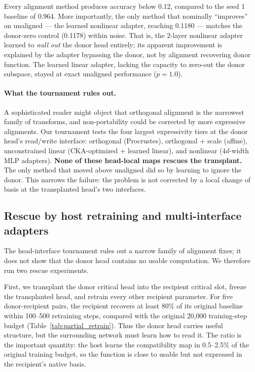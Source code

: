 \documentclass[final]{article}
\begin{document}
Every alignment method produces accuracy below 0.12, compared to the seed 1
baseline of 0.964. More importantly, the only method that nominally
``improves'' on unaligned --- the learned nonlinear adapter, reaching 0.1180
--- matches the donor-zero control (0.1178) within noise. That is, the
2-layer nonlinear adapter learned to \emph{null out} the donor head entirely;
its apparent improvement is explained by the adapter bypassing the donor, not
by alignment recovering donor function. The learned linear adapter, lacking
the capacity to zero-out the donor subspace, stayed at exact unaligned
performance ($p=1.0$).

\paragraph{What the tournament rules out.}
A sophisticated reader might object that orthogonal alignment is the narrowest
family of transforms, and non-portability could be corrected by more
expressive alignments. Our tournament tests the four largest expressivity
tiers at the donor head's read/write interface: orthogonal (Procrustes),
orthogonal + scale (affine), unconstrained linear (CKA-optimized + learned
linear), and nonlinear ($4d$-width MLP adapters). \textbf{None of these
head-local maps rescues the transplant.} The only method that moved above
unaligned did so by learning to ignore the donor. This narrows the failure:
the problem is not corrected by a local change of basis at the transplanted
head's two interfaces.

\subsection{Rescue by host retraining and multi-interface adapters}
\label{sec:rescue}

The head-interface tournament rules out a narrow family of alignment fixes; it
does not show that the donor head contains no usable computation. We therefore
run two rescue experiments.

First, we transplant the donor critical head into the recipient critical slot,
freeze the transplanted head, and retrain every other recipient parameter. For
five donor-recipient pairs, the recipient recovers at least 80\% of its original
baseline within 100--500 retraining steps, compared with the original 20,000
training-step budget (Table~\ref{tab:partial_retrain}). Thus the donor head
carries useful structure, but the surrounding network must learn how to read it.
The ratio is the important quantity: the host learns the compatibility map in
0.5--2.5\% of the original training budget, so the function is close to usable
but not expressed in the recipient's native basis.
\end{document}
